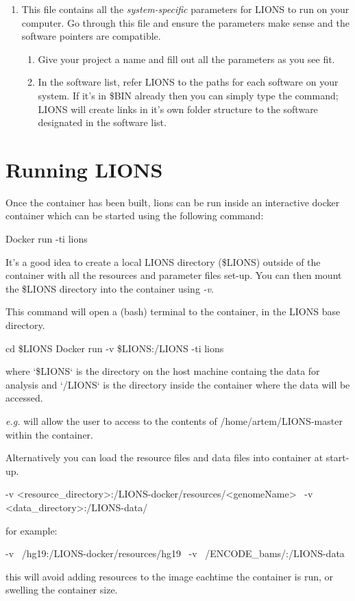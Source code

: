 \documentclass[11pt]{scrartcl}
\begin{document}
\begin{enumerate}
\item This file contains all the \textit{system-specific} parameters for LIONS to run on your computer. Go through this file and ensure the parameters make sense and the software pointers are compatible.
\begin{enumerate}
\item Give your project a name and fill out all the parameters as you see fit.
\item In the software list, refer LIONS to the paths for each software on your system. If it's in \$BIN already then you can simply type the command; LIONS will create links in it's own folder structure to the software designated in the software list.
\end{enumerate}
\end{enumerate}

\clearpage




\section{Running LIONS}
\label{lions_run}

Once the container has been built, lions can be run inside an interactive docker container
which can be started using the following command:

\begin{bash}
Docker run -ti lions
\end{bash}

It's a good idea to create a local LIONS directory (\$LIONS) outside of the container with all the resources and parameter files set-up. You can then mount the \$LIONS directory into the container using \textit{-v}.

This command will open a (bash) terminal to the container, in the LIONS base directory.
 
\begin{bash}
cd \$LIONS
Docker run -v \$LIONS:/LIONS -ti lions
\end{bash}

where `\$LIONS` is the directory on the host machine containg the data for analysis and `/LIONS` is the directory inside the container where the data will be accessed.

\textit{e.g.}  will allow the user to access to the contents of /home/artem/LIONS-master within the container.

\begin{framed}
Alternatively you can load the resource files and data files into container at start-up.

\begin{bash}
-v <resource_directory>:/LIONS-docker/resources/<genomeName> \
-v <data_directory>:/LIONS-data/
\end{bash}
for example:
\begin{bash}
-v ~/hg19:/LIONS-docker/resources/hg19 \
-v ~/ENCODE_bams/:/LIONS-data
\end{bash}

this will avoid adding resources to the image eachtime the container is run, or swelling the container size.
\end{framed}
\end{document}
